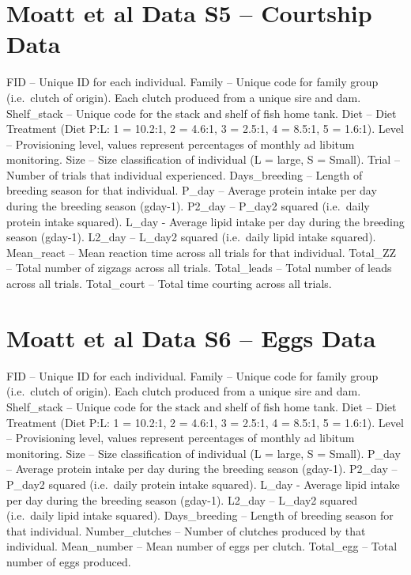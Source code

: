 \documentclass[]{book}
\begin{document}
\hypertarget{moatt-et-al-data-s5-courtship-data}{%
\section{Moatt et al Data S5 -- Courtship Data}\label{moatt-et-al-data-s5-courtship-data}}

FID -- Unique ID for each individual.
Family -- Unique code for family group (i.e.~clutch of origin). Each clutch produced from a unique sire and dam.
Shelf\_stack -- Unique code for the stack and shelf of fish home tank.
Diet -- Diet Treatment (Diet P:L: 1 = 10.2:1, 2 = 4.6:1, 3 = 2.5:1, 4 = 8.5:1, 5 = 1.6:1).
Level -- Provisioning level, values represent percentages of monthly ad libitum monitoring.
Size -- Size classification of individual (L = large, S = Small).
Trial -- Number of trials that individual experienced.
Days\_breeding -- Length of breeding season for that individual.
P\_day -- Average protein intake per day during the breeding season (gday-1).
P2\_day -- P\_day2 squared (i.e.~daily protein intake squared).
L\_day - Average lipid intake per day during the breeding season (gday-1).
L2\_day -- L\_day2 squared (i.e.~daily lipid intake squared).
Mean\_react -- Mean reaction time across all trials for that individual.
Total\_ZZ -- Total number of zigzags across all trials.
Total\_leads -- Total number of leads across all trials.
Total\_court -- Total time courting across all trials.

\hypertarget{moatt-et-al-data-s6-eggs-data}{%
\section{Moatt et al Data S6 -- Eggs Data}\label{moatt-et-al-data-s6-eggs-data}}

FID -- Unique ID for each individual.
Family -- Unique code for family group (i.e.~clutch of origin). Each clutch produced from a unique sire and dam.
Shelf\_stack -- Unique code for the stack and shelf of fish home tank.
Diet -- Diet Treatment (Diet P:L: 1 = 10.2:1, 2 = 4.6:1, 3 = 2.5:1, 4 = 8.5:1, 5 = 1.6:1).
Level -- Provisioning level, values represent percentages of monthly ad libitum monitoring.
Size -- Size classification of individual (L = large, S = Small).
P\_day -- Average protein intake per day during the breeding season (gday-1).
P2\_day -- P\_day2 squared (i.e.~daily protein intake squared).
L\_day - Average lipid intake per day during the breeding season (gday-1).
L2\_day -- L\_day2 squared (i.e.~daily lipid intake squared).
Days\_breeding -- Length of breeding season for that individual.
Number\_clutches -- Number of clutches produced by that individual.
Mean\_number -- Mean number of eggs per clutch.
Total\_egg -- Total number of eggs produced.
\end{document}

